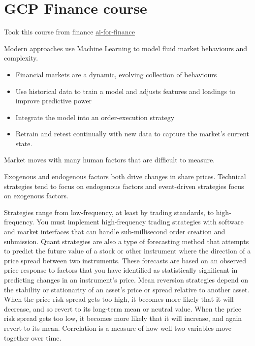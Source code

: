 

\section{GCP Finance course}

Took this course from finance
\href{https://github.com/GoogleCloudPlatform/training-data-analyst/tree/master/courses/ai-for-finance}{ai-for-finance}


Modern approaches use Machine Learning
to model fluid market behaviours and complexity.

\begin{itemize}
\item Financial markets are a dynamic, evolving collection of behaviours
\item Use historical data to train a model and adjusts
features and loadings to improve predictive power
\item Integrate the model into an order-execution strategy
\item Retrain and retest continually with new data
to capture the market's current state.
\end{itemize}


Market moves with many human factors that are difficult to measure.

Exogenous and endogenous factors both drive
changes in share prices. Technical strategies tend
to focus on endogenous factors and event-driven
strategies focus on exogenous factors.



 Strategies range
from low-frequency, at least by trading
standards, to high-frequency. You must implement high-frequency
trading strategies with software and market
interfaces that can handle sub-millisecond order
creation and submission. Quant strategies
are also a type of forecasting method that
attempts to predict the future value of a stock or other instrument where
the direction of a price spread between
two instruments. These forecasts are based on an observed price response
to factors that you have identified as
statistically significant in predicting changes in
an instrument's price. Mean reversion strategies
depend on the stability or stationarity of an asset's price or spread relative
to another asset. When the price risk
spread gets too high, it becomes more likely
that it will decrease, and so revert to its long-term
mean or neutral value. When the price risk
spread gets too low, it becomes more likely
that it will increase, and again revert to its mean. Correlation is a
measure of how well two variables move
together over time.
